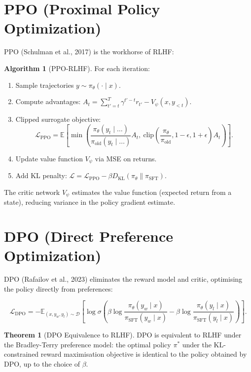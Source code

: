 \documentclass[11pt,a4paper]{book}
\theoremstyle{definition}
\newtheorem{theorem}{Theorem}[chapter]
\newtheorem{algorithm}{Algorithm}[chapter]
\begin{document}
\section{PPO (Proximal Policy Optimization)}

PPO (Schulman et al., 2017) is the workhorse of RLHF:

\begin{algorithm}[PPO-RLHF]
	For each iteration:
	\begin{enumerate}
		\item Sample trajectories $y \sim \pi_\theta(\cdot \mid x)$.
		\item Compute advantages: $A_t = \sum_{t'=t}^T \gamma^{t'-t} r_{t'} - V_\psi(x, y_{<t})$.
		\item Clipped surrogate objective:
		      \begin{equation}
			      \mathcal{L}_{\text{PPO}} = \mathbb{E}\left[\min\left(\frac{\pi_\theta(y_t \mid \dots)}{\pi_{\text{old}}(y_t \mid \dots)} A_t,\ \text{clip}\left(\frac{\pi_\theta}{\pi_{\text{old}}}, 1-\epsilon, 1+\epsilon\right) A_t\right)\right].
		      \end{equation}
		\item Update value function $V_\psi$ via MSE on returns.
		\item Add KL penalty: $\mathcal{L} = \mathcal{L}_{\text{PPO}} - \beta D_{\mathrm{KL}}(\pi_\theta \parallel \pi_{\text{SFT}})$.
	\end{enumerate}
\end{algorithm}

The critic network $V_\psi$ estimates the value function (expected return from a state), reducing variance in the policy gradient estimate.

\section{DPO (Direct Preference Optimization)}

DPO (Rafailov et al., 2023) eliminates the reward model and critic, optimising the policy directly from preferences:

\begin{equation}
	\mathcal{L}_{\text{DPO}} = -\mathbb{E}_{(x, y_w, y_l) \sim \mathcal{D}}\left[\log \sigma\left(\beta \log \frac{\pi_\theta(y_w \mid x)}{\pi_{\text{SFT}}(y_w \mid x)} - \beta \log \frac{\pi_\theta(y_l \mid x)}{\pi_{\text{SFT}}(y_l \mid x)}\right)\right].
\end{equation}

\begin{theorem}[DPO Equivalence to RLHF]
	DPO is equivalent to RLHF under the Bradley-Terry preference model: the optimal policy $\pi^*$ under the KL-constrained reward maximisation objective is identical to the policy obtained by DPO, up to the choice of $\beta$.
\end{theorem}
\end{document}

